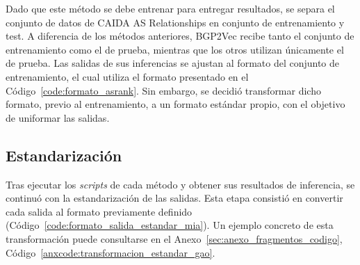 \begin{itemize}
Dado que este método se debe entrenar para entregar resultados, se separa el conjunto de datos de CAIDA AS Relationships en conjunto de entrenamiento y test. A diferencia de los métodos anteriores, BGP2Vec recibe tanto el conjunto de entrenamiento como el de prueba, mientras que los otros utilizan únicamente el de prueba. Las salidas de sus inferencias se ajustan al formato del conjunto de entrenamiento, el cual utiliza el formato presentado en el Código~\ref{code:formato_asrank}. Sin embargo, se decidió transformar dicho formato, previo al entrenamiento, a un formato estándar propio, con el objetivo de uniformar las salidas.

\end{itemize}

\subsection{Estandarización}

Tras ejecutar los \textit{scripts} de cada método y obtener sus resultados de inferencia, se continuó con la estandarización de las salidas. Esta etapa consistió en convertir cada salida al formato previamente definido (Código~\ref{code:formato_salida_estandar_mia}). Un ejemplo concreto de esta transformación puede consultarse en el Anexo~\ref{sec:anexo_fragmentos_codigo}, Código~\ref{anxcode:transformacion_estandar_gao}.





